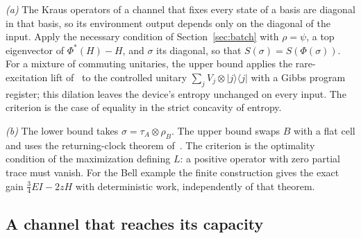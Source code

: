 \documentclass[11pt]{article}
\theoremstyle{definition}
\theoremstyle{remark}
\begin{document}
\emph{(a)} The Kraus operators of a channel that fixes every state of a basis are diagonal in that basis, so its environment output depends only on the diagonal of the input. Apply the necessary condition of Section~\ref{sec:batch} with $\rho=\psi$, a top eigenvector of $\Phi^*(H)-H$, and $\sigma$ its diagonal, so that $S(\sigma)=S(\Phi(\sigma))$. For a mixture of commuting unitaries, the upper bound applies the rare-excitation lift of~\cite{SaveWork} to the controlled unitary $\sum_jV_j\otimes|j\rangle\langle j|$ with a Gibbs program register; this dilation leaves the device's entropy unchanged on every input. The criterion is the case of equality in the strict concavity of entropy.

\emph{(b)} The lower bound takes $\sigma=\tau_A\otimes\rho_B$. The upper bound swaps $B$ with a flat cell and uses the returning-clock theorem of~\cite{SaveWork}. The criterion is the optimality condition of the maximization defining $L$: a positive operator with zero partial trace must vanish. For the Bell example the finite construction gives the exact gain $\tfrac34EI-2zH$ with deterministic work, independently of that theorem.

\subsection{A channel that reaches its capacity}\label{pf:reach}
\end{document}
